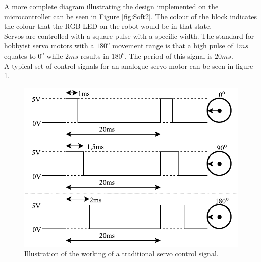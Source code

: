 A more complete diagram illustrating the design implemented on the microcontroller can be seen in Figure \ref{fig:Soft2}. The colour of the block indicates the colour that the RGB LED on the robot would be in that state.\\

Servos are controlled with a square pulse with a specific width. The standard for hobbyist servo motors with a $180^o$ movement range is that a high pulse of $1ms$ equates to $0^o$ while $2ms$ results in $180^o$. The period of this signal is $20ms$.\\

A typical set of control signals for an analogue servo motor can be seen in figure \ref{fig:Servo1}.

\begin{figure}[H]
\centering
\includegraphics[scale = 1]{pics/Servo1.pdf}
\caption{Illustration of the working of a traditional servo control signal.}
\label{fig:Servo1}
\end{figure}

